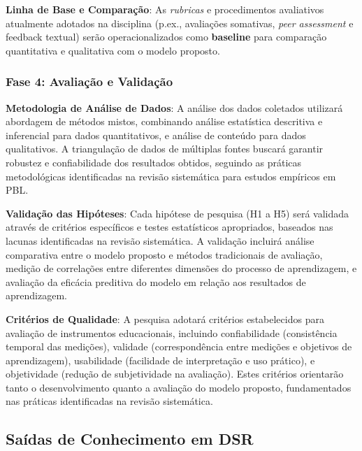 \documentclass[12pt,a4paper]{article}
\begin{document}
\textbf{Linha de Base e Comparação}: As \textit{rubricas} e procedimentos
avaliativos atualmente adotados na disciplina (p.ex., avaliações somativas,
\textit{peer assessment} e feedback textual) serão operacionalizados como
\textbf{baseline} para comparação quantitativa e qualitativa com o modelo
proposto.

\subsubsection{Fase 4: Avaliação e Validação}

\textbf{Metodologia de Análise de Dados}: A análise dos dados coletados utilizará abordagem de métodos mistos, combinando análise estatística descritiva e inferencial para dados quantitativos, e análise de conteúdo para dados qualitativos. A triangulação de dados de múltiplas fontes buscará garantir robustez e confiabilidade dos resultados obtidos, seguindo as práticas metodológicas identificadas na revisão sistemática para estudos empíricos em PBL.

\textbf{Validação das Hipóteses}: Cada hipótese de pesquisa (H1 a H5) será validada através de critérios específicos e testes estatísticos apropriados, baseados nas lacunas identificadas na revisão sistemática. A validação incluirá análise comparativa entre o modelo proposto e métodos tradicionais de avaliação, medição de correlações entre diferentes dimensões do processo de aprendizagem, e avaliação da eficácia preditiva do modelo em relação aos resultados de aprendizagem.

\textbf{Critérios de Qualidade}: A pesquisa adotará critérios estabelecidos para avaliação de instrumentos educacionais, incluindo confiabilidade (consistência temporal das medições), validade (correspondência entre medições e objetivos de aprendizagem), usabilidade (facilidade de interpretação e uso prático), e objetividade (redução de subjetividade na avaliação). Estes critérios orientarão tanto o desenvolvimento quanto a avaliação do modelo proposto, fundamentados nas práticas identificadas na revisão sistemática.

\subsection{Saídas de Conhecimento em DSR}
\end{document}
